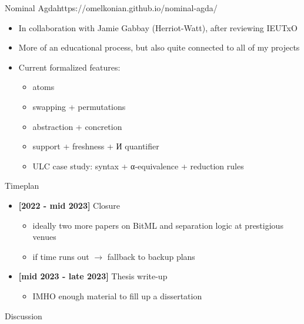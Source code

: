 \documentclass[aspectratio=169]{beamer}
\renewcommand\alert[1]{\textcolor{mLightBrown}{#1}}
\begin{document}
\begin{frame}{Nominal Agda\hfill\alert{https://omelkonian.github.io/nominal-agda/}}
\begin{itemize}
\item In collaboration with Jamie Gabbay (Herriot-Watt), after reviewing IEUTxO
\item More of an educational process, but also quite connected to all of my projects
\item Current formalized features:
  \begin{itemize}
  \item atoms
  \item swapping + permutations
  \item abstraction + concretion
  \item support + freshness + И quantifier
  \item ULC case study: syntax + α-equivalence + reduction rules
  \end{itemize}
\end{itemize}
\end{frame}

\begin{frame}{Timeplan}
\begin{itemize}
\item \textbf{[2022 - mid 2023]} Closure
  \begin{itemize}
  \item ideally two more papers on BitML and separation logic at prestigious venues
  \item if time runs out $\to$ fallback to backup plans
  \end{itemize}
\item \textbf{[mid 2023 - late 2023]} Thesis write-up
  \begin{itemize}
  \item IMHO enough material to fill up a dissertation
  \end{itemize}
\end{itemize}
\end{frame}

\begin{frame}[standout]
Discussion
\end{frame}
\end{document}
